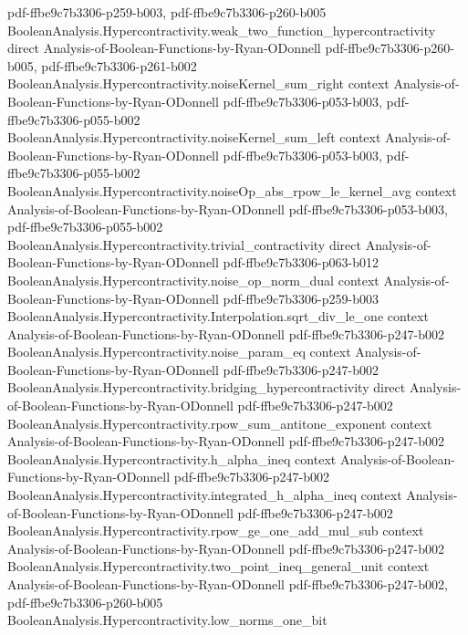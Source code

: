 \begin{theorem}
  {pdf-ffbe9c7b3306-p259-b003,
    pdf-ffbe9c7b3306-p260-b005}
\proofstep
  {BooleanAnalysis.Hypercontractivity.weak_two_function_hypercontractivity}
  {direct}
  {Analysis-of-Boolean-Functions-by-Ryan-ODonnell}
  {pdf-ffbe9c7b3306-p260-b005,
    pdf-ffbe9c7b3306-p261-b002}
\proofstep
  {BooleanAnalysis.Hypercontractivity.noiseKernel_sum_right}
  {context}
  {Analysis-of-Boolean-Functions-by-Ryan-ODonnell}
  {pdf-ffbe9c7b3306-p053-b003,
    pdf-ffbe9c7b3306-p055-b002}
\proofstep
  {BooleanAnalysis.Hypercontractivity.noiseKernel_sum_left}
  {context}
  {Analysis-of-Boolean-Functions-by-Ryan-ODonnell}
  {pdf-ffbe9c7b3306-p053-b003,
    pdf-ffbe9c7b3306-p055-b002}
\proofstep
  {BooleanAnalysis.Hypercontractivity.noiseOp_abs_rpow_le_kernel_avg}
  {context}
  {Analysis-of-Boolean-Functions-by-Ryan-ODonnell}
  {pdf-ffbe9c7b3306-p053-b003,
    pdf-ffbe9c7b3306-p055-b002}
\proofstep
  {BooleanAnalysis.Hypercontractivity.trivial_contractivity}
  {direct}
  {Analysis-of-Boolean-Functions-by-Ryan-ODonnell}
  {pdf-ffbe9c7b3306-p063-b012}
\proofstep
  {BooleanAnalysis.Hypercontractivity.noise_op_norm_dual}
  {context}
  {Analysis-of-Boolean-Functions-by-Ryan-ODonnell}
  {pdf-ffbe9c7b3306-p259-b003}
\proofstep
  {BooleanAnalysis.Hypercontractivity.Interpolation.sqrt_div_le_one}
  {context}
  {Analysis-of-Boolean-Functions-by-Ryan-ODonnell}
  {pdf-ffbe9c7b3306-p247-b002}
\proofstep
  {BooleanAnalysis.Hypercontractivity.noise_param_eq}
  {context}
  {Analysis-of-Boolean-Functions-by-Ryan-ODonnell}
  {pdf-ffbe9c7b3306-p247-b002}
\proofstep
  {BooleanAnalysis.Hypercontractivity.bridging_hypercontractivity}
  {direct}
  {Analysis-of-Boolean-Functions-by-Ryan-ODonnell}
  {pdf-ffbe9c7b3306-p247-b002}
\proofstep
  {BooleanAnalysis.Hypercontractivity.rpow_sum_antitone_exponent}
  {context}
  {Analysis-of-Boolean-Functions-by-Ryan-ODonnell}
  {pdf-ffbe9c7b3306-p247-b002}
\proofstep
  {BooleanAnalysis.Hypercontractivity.h_alpha_ineq}
  {context}
  {Analysis-of-Boolean-Functions-by-Ryan-ODonnell}
  {pdf-ffbe9c7b3306-p247-b002}
\proofstep
  {BooleanAnalysis.Hypercontractivity.integrated_h_alpha_ineq}
  {context}
  {Analysis-of-Boolean-Functions-by-Ryan-ODonnell}
  {pdf-ffbe9c7b3306-p247-b002}
\proofstep
  {BooleanAnalysis.Hypercontractivity.rpow_ge_one_add_mul_sub}
  {context}
  {Analysis-of-Boolean-Functions-by-Ryan-ODonnell}
  {pdf-ffbe9c7b3306-p247-b002}
\proofstep
  {BooleanAnalysis.Hypercontractivity.two_point_ineq_general_unit}
  {context}
  {Analysis-of-Boolean-Functions-by-Ryan-ODonnell}
  {pdf-ffbe9c7b3306-p247-b002,
    pdf-ffbe9c7b3306-p260-b005}
\proofstep
  {BooleanAnalysis.Hypercontractivity.low_norms_one_bit}

\end{theorem}
